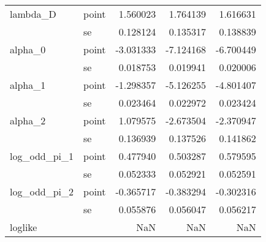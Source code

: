 \begin{tabular}{llrrr}
lambda\_D & point &    1.560023 &  1.764139 &    1.616631 \\
        & se &    0.128124 &  0.135317 &    0.138839 \\
alpha\_0 & point &   -3.031333 & -7.124168 &   -6.700449 \\
        & se &    0.018753 &  0.019941 &    0.020006 \\
alpha\_1 & point &   -1.298357 & -5.126255 &   -4.801407 \\
        & se &    0.023464 &  0.022972 &    0.023424 \\
alpha\_2 & point &    1.079575 & -2.673504 &   -2.370947 \\
        & se &    0.136939 &  0.137526 &    0.141862 \\
log\_odd\_pi\_1 & point &    0.477940 &  0.503287 &    0.579595 \\
        & se &    0.052333 &  0.052921 &    0.052591 \\
log\_odd\_pi\_2 & point &   -0.365717 & -0.383294 &   -0.302316 \\
        & se &    0.055876 &  0.056047 &    0.056217 \\
loglike &    &         NaN &       NaN &         NaN \\
\bottomrule
\end{tabular}
